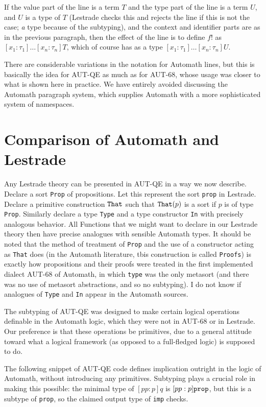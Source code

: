\documentclass{article}
\begin{document}
If the value part of the line is a term $T$ and the type part of the line is a term $U$, and $U$ is a type of $T$ (Lestrade checks this and rejects the line if this is not the case; {\em a\/} type because of the subtyping), and the context and identifier parts are as in the previous paragraph,  then the effect of the line is to define $f!$ as $[x_1:\tau_1]\ldots[x_n:\tau_n]T$, which of course has as a type $[x_1:\tau_1]\ldots[x_n:\tau_n]U$.

There are considerable variations in the notation for Automath lines, but this is basically the idea for AUT-QE as much as for AUT-68, whose usage was closer to what is shown here in practice.  We have entirely avoided discussing the Automath paragraph system, which supplies Automath with a more sophisticated system of namespaces.

\section{Comparison of Automath and Lestrade}

Any Lestrade theory can be presented in AUT-QE in a way we now describe.  Declare a sort {\tt Prop} of propositions.  Let this represent the
sort {\tt prop} in Lestrade.  Declare a primitive construction ${\tt That}$ such that ${\tt That}(p)$ is a sort if $p$ is of type {\tt Prop}.
Similarly declare a type {\tt Type} and a type constructor {\tt In} with precisely analogous behavior.  All Functions that we might want to declare
in our Lestrade theory then have precise analogues with sensible Automath types.  It should be noted that the method of treatment of {\tt Prop}
and the use of a constructor acting as {\tt That} does (in the Automath literature, tbis construction is called {\tt Proofs}) is exactly how propositions
and their proofs were treated in the first implemented dialect AUT-68 of Automath, in which {\tt type} was the only metasort (and there was no use
of metasort abstractions, and so no subtyping).  I do not know if analogues of {\tt Type} and {\tt In} appear in the Automath sources.

The subtyping of AUT-QE was designed to make certain logical operations definable in the Automath logic, which they were not in AUT-68 or in Lestrade.
Our preference is that these operations be primitives, due to a general attitude toward what a logical framework (as opposed to a full-fledged logic) is supposed to do.

The following snippet of AUT-QE code defines implication outright in the logic of Automath, without introducing any primitives.  Subtyping plays a crucial role in making this possible:  the minimal type of $[pp:p]q$ is $[pp:p]{\tt prop}$, but this is a subtype of {\tt prop}, so the claimed output  type of {\tt imp} checks.
\end{document}
